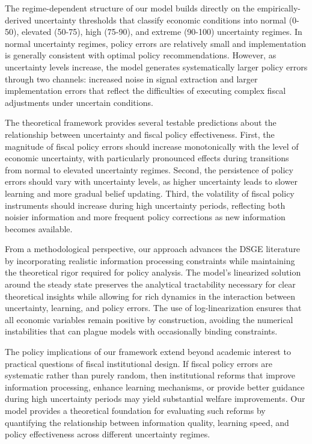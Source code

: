 \documentclass[5p,authoryear]{elsarticle}
\begin{document}
The regime-dependent structure of our model builds directly on the empirically-derived uncertainty thresholds that classify economic conditions into normal (0-50), elevated (50-75), high (75-90), and extreme (90-100) uncertainty regimes. In normal uncertainty regimes, policy errors are relatively small and implementation is generally consistent with optimal policy recommendations. However, as uncertainty levels increase, the model generates systematically larger policy errors through two channels: increased noise in signal extraction and larger implementation errors that reflect the difficulties of executing complex fiscal adjustments under uncertain conditions.

The theoretical framework provides several testable predictions about the relationship between uncertainty and fiscal policy effectiveness. First, the magnitude of fiscal policy errors should increase monotonically with the level of economic uncertainty, with particularly pronounced effects during transitions from normal to elevated uncertainty regimes. Second, the persistence of policy errors should vary with uncertainty levels, as higher uncertainty leads to slower learning and more gradual belief updating. Third, the volatility of fiscal policy instruments should increase during high uncertainty periods, reflecting both noisier information and more frequent policy corrections as new information becomes available.

From a methodological perspective, our approach advances the DSGE literature by incorporating realistic information processing constraints while maintaining the theoretical rigor required for policy analysis. The model's linearized solution around the steady state preserves the analytical tractability necessary for clear theoretical insights while allowing for rich dynamics in the interaction between uncertainty, learning, and policy errors. The use of log-linearization ensures that all economic variables remain positive by construction, avoiding the numerical instabilities that can plague models with occasionally binding constraints.

The policy implications of our framework extend beyond academic interest to practical questions of fiscal institutional design. If fiscal policy errors are systematic rather than purely random, then institutional reforms that improve information processing, enhance learning mechanisms, or provide better guidance during high uncertainty periods may yield substantial welfare improvements. Our model provides a theoretical foundation for evaluating such reforms by quantifying the relationship between information quality, learning speed, and policy effectiveness across different uncertainty regimes.
\end{document}

